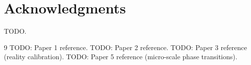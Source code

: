 \documentclass[aps,reprint,amsmath,amssymb,nofootinbib,superscriptaddress,floatfix]{revtex4-2}
\begin{document}
\section*{Acknowledgments}
TODO.

\begin{thebibliography}{9}
 TODO: Paper 1 reference.
 TODO: Paper 2 reference.
 TODO: Paper 3 reference (reality calibration).
 TODO: Paper 5 reference (micro-scale phase transitions).
\end{thebibliography}
\end{document}
